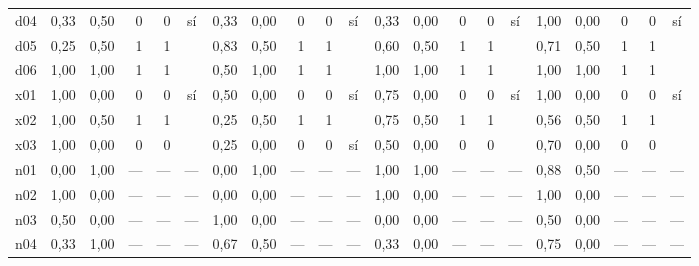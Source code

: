 \begin{scriptsize}
\begin{longtable}{@{}l rrrrc rrrrc rrrrc rrrrc@{}}
d04 & 0,33 & 0,50 & 0 & 0 & sí & 0,33 & 0,00 & 0 & 0 & sí & 0,33 & 0,00 & 0 & 0 & sí & 1,00 & 0,00 & 0 & 0 & sí \\
d05 & 0,25 & 0,50 & 1 & 1 &  & 0,83 & 0,50 & 1 & 1 &  & 0,60 & 0,50 & 1 & 1 &  & 0,71 & 0,50 & 1 & 1 &  \\
d06 & 1,00 & 1,00 & 1 & 1 &  & 0,50 & 1,00 & 1 & 1 &  & 1,00 & 1,00 & 1 & 1 &  & 1,00 & 1,00 & 1 & 1 &  \\
x01 & 1,00 & 0,00 & 0 & 0 & sí & 0,50 & 0,00 & 0 & 0 & sí & 0,75 & 0,00 & 0 & 0 & sí & 1,00 & 0,00 & 0 & 0 & sí \\
x02 & 1,00 & 0,50 & 1 & 1 &  & 0,25 & 0,50 & 1 & 1 &  & 0,75 & 0,50 & 1 & 1 &  & 0,56 & 0,50 & 1 & 1 &  \\
x03 & 1,00 & 0,00 & 0 & 0 &  & 0,25 & 0,00 & 0 & 0 & sí & 0,50 & 0,00 & 0 & 0 &  & 0,70 & 0,00 & 0 & 0 &  \\
n01 & 0,00 & 1,00 & --- & --- & --- & 0,00 & 1,00 & --- & --- & --- & 1,00 & 1,00 & --- & --- & --- & 0,88 & 0,50 & --- & --- & --- \\
n02 & 1,00 & 0,00 & --- & --- & --- & 0,00 & 0,00 & --- & --- & --- & 1,00 & 0,00 & --- & --- & --- & 1,00 & 0,00 & --- & --- & --- \\
n03 & 0,50 & 0,00 & --- & --- & --- & 1,00 & 0,00 & --- & --- & --- & 0,00 & 0,00 & --- & --- & --- & 0,50 & 0,00 & --- & --- & --- \\
n04 & 0,33 & 1,00 & --- & --- & --- & 0,67 & 0,50 & --- & --- & --- & 0,33 & 0,00 & --- & --- & --- & 0,75 & 0,00 & --- & --- & --- \\
\bottomrule
\end{longtable}
\end{scriptsize}

